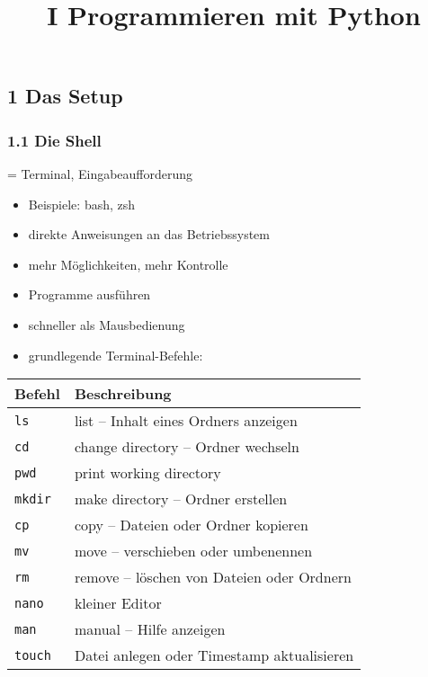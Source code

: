 \documentclass[
  11pt,
  a4paper,
  DIV=11,
  numbers=noendperiod]{scrartcl}
\title{I Programmieren mit Python}
\author{}
\date{}
\providecommand{\tightlist}{%
  \setlength{\itemsep}{0pt}\setlength{\parskip}{0pt}}\usepackage{longtable,booktabs,array}
\begin{document}
\maketitle


\subsection{1 Das Setup}\label{das-setup}

\subsubsection{1.1 Die Shell}\label{die-shell}

= Terminal, Eingabeaufforderung

\begin{itemize}
\tightlist
\item
  Beispiele: bash, zsh
\item
  direkte Anweisungen an das Betriebssystem
\item
  mehr Möglichkeiten, mehr Kontrolle
\item
  Programme ausführen
\item
  schneller als Mausbedienung
\item
  grundlegende Terminal-Befehle:
\end{itemize}

\begin{longtable}[]{@{}
  >{\raggedright\arraybackslash}p{}
  >{\raggedright\arraybackslash}p{}@{}}
\toprule\noalign{}
\begin{minipage}[b]{\linewidth}\raggedright
Befehl
\end{minipage} & \begin{minipage}[b]{\linewidth}\raggedright
Beschreibung
\end{minipage} \\
\midrule\noalign{}
\endhead
\bottomrule\noalign{}
\endlastfoot
\texttt{ls} & list -- Inhalt eines Ordners anzeigen \\
\texttt{cd} & change directory -- Ordner wechseln \\
\texttt{pwd} & print working directory \\
\texttt{mkdir} & make directory -- Ordner erstellen \\
\texttt{cp} & copy -- Dateien oder Ordner kopieren \\
\texttt{mv} & move -- verschieben oder umbenennen \\
\texttt{rm} & remove -- löschen von Dateien oder Ordnern \\
\texttt{nano} & kleiner Editor \\
\texttt{man} & manual -- Hilfe anzeigen \\
\texttt{touch} & Datei anlegen oder Timestamp aktualisieren \\
\end{longtable}
\end{document}
